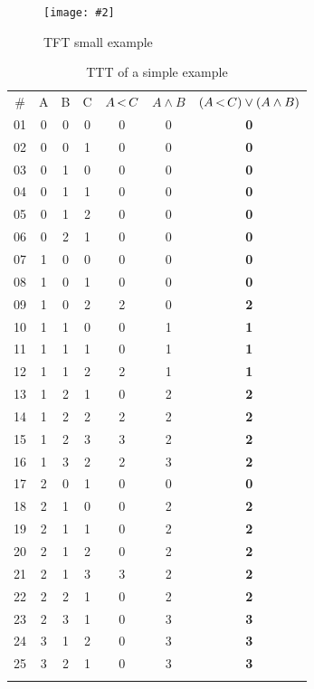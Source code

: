 \documentclass[12pt,openright,twoside,a4paper,oldfontcommands,english,brazil,final]{abntex2}
\theoremstyle{theo}
\newcommand{\includegraphicsaspectratio}[2][1]{%
  \texttt{[image: \#2]}%
}
\newcommand{\parsin}[1]{\ensuremath\left( #1 \right)}
\def\pand{\ensuremath\operatorname{<}}
\begin{document}
\begin{figure}[t]
  \centering
  \includegraphicsaspectratio[0.55]{tft-small-example}
  \caption{\acs*{TFT} small example}
  \label{fig:tft-small-example}
\end{figure}

\begin{table}
  \caption{\acs*{TTT} of a simple example}
  \label{tbl:ttt-small-example}
  \centering
  {\scriptsize
  \begin{tabular}{ccccccc}
  \hline\noalign{\smallskip}
  \# & A & B & C & $A \pand C$ & $A \land B$ & $\parsin{A \pand C} \lor \parsin{A \land B}$ \\
  \noalign{\smallskip}\hline\noalign{\smallskip}
  01 & 0 & 0 & 0 & 0 & 0 & \textbf{0}\\
  02 & 0 & 0 & 1 & 0 & 0 & \textbf{0}\\
  03 & 0 & 1 & 0 & 0 & 0 & \textbf{0}\\
  04 & 0 & 1 & 1 & 0 & 0 & \textbf{0}\\
  05 & 0 & 1 & 2 & 0 & 0 & \textbf{0}\\
  06 & 0 & 2 & 1 & 0 & 0 & \textbf{0}\\
  07 & 1 & 0 & 0 & 0 & 0 & \textbf{0}\\
  08 & 1 & 0 & 1 & 0 & 0 & \textbf{0}\\
  09 & 1 & 0 & 2 & 2 & 0 & \textbf{2}\\
  10 & 1 & 1 & 0 & 0 & 1 & \textbf{1}\\
  11 & 1 & 1 & 1 & 0 & 1 & \textbf{1}\\
  12 & 1 & 1 & 2 & 2 & 1 & \textbf{1}\\
  13 & 1 & 2 & 1 & 0 & 2 & \textbf{2}\\
  14 & 1 & 2 & 2 & 2 & 2 & \textbf{2}\\
  15 & 1 & 2 & 3 & 3 & 2 & \textbf{2}\\
  16 & 1 & 3 & 2 & 2 & 3 & \textbf{2}\\
  17 & 2 & 0 & 1 & 0 & 0 & \textbf{0}\\
  18 & 2 & 1 & 0 & 0 & 2 & \textbf{2}\\
  19 & 2 & 1 & 1 & 0 & 2 & \textbf{2}\\
  20 & 2 & 1 & 2 & 0 & 2 & \textbf{2}\\
  21 & 2 & 1 & 3 & 3 & 2 & \textbf{2}\\
  22 & 2 & 2 & 1 & 0 & 2 & \textbf{2}\\
  23 & 2 & 3 & 1 & 0 & 3 & \textbf{3}\\
  24 & 3 & 1 & 2 & 0 & 3 & \textbf{3}\\
  25 & 3 & 2 & 1 & 0 & 3 & \textbf{3}\\
  \noalign{\smallskip}\hline
  \end{tabular}
  }
\end{table}
\end{document}
